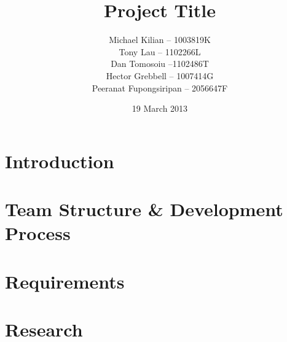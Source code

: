 \documentclass{l3proj}
\begin{document}
\title{Project Title}
\author{Michael Kilian -- 1003819K \\
        Tony Lau -- 1102266L\\
        Dan Tomosoiu --1102486T \\
        Hector Grebbell -- 1007414G \\
        Peeranat Fupongsiripan -- 2056647F}
\date{19 March 2013}
\maketitle

\begin{abstract}

\end{abstract}

\educationalconsent
\tableofcontents
\chapter{Introduction}
\label{introduction}




\chapter{Team Structure \& Development Process}
\label{organisations}




\chapter{Requirements}
\label{requirements}


\chapter{Research}
\label{research}





\end{document}
